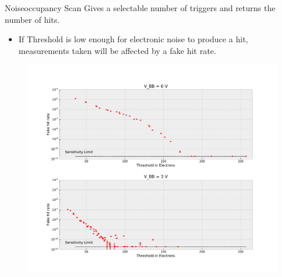 \documentclass{beamer}
\begin{document}
\begin{frame}{Noiseoccupancy Scan}
    Gives a selectable number of triggers and returns the number of hits.
    \begin{itemize}
	\item If Threshold is low enough for electronic noise to produce a hit,
	    measurements taken will be affected by a fake hit rate.
    \end{itemize}
    \pause
    \begin{figure}[H]
	\centering
	\includegraphics[trim=0 360 0 70, clip, width=\textwidth]{Fake_Hit_Rate.pdf}
    \end{figure}
\end{frame}
\end{document}
